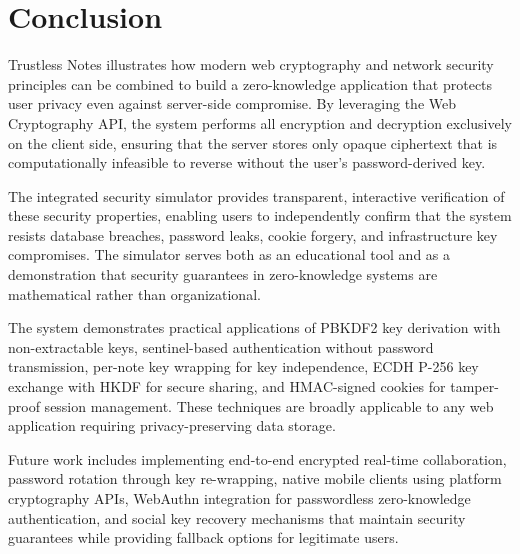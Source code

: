 \documentclass[conference]{IEEEtran}
\begin{document}
\section{Conclusion}

Trustless Notes illustrates how modern web cryptography and network security principles can be combined to build a zero-knowledge application that protects user privacy even against server-side compromise. By leveraging the Web Cryptography API, the system performs all encryption and decryption exclusively on the client side, ensuring that the server stores only opaque ciphertext that is computationally infeasible to reverse without the user's password-derived key.

The integrated security simulator provides transparent, interactive verification of these security properties, enabling users to independently confirm that the system resists database breaches, password leaks, cookie forgery, and infrastructure key compromises. The simulator serves both as an educational tool and as a demonstration that security guarantees in zero-knowledge systems are mathematical rather than organizational.

The system demonstrates practical applications of PBKDF2 key derivation with non-extractable keys, sentinel-based authentication without password transmission, per-note key wrapping for key independence, ECDH P-256 key exchange with HKDF for secure sharing, and HMAC-signed cookies for tamper-proof session management. These techniques are broadly applicable to any web application requiring privacy-preserving data storage.

Future work includes implementing end-to-end encrypted real-time collaboration, password rotation through key re-wrapping, native mobile clients using platform cryptography APIs, WebAuthn integration for passwordless zero-knowledge authentication, and social key recovery mechanisms that maintain security guarantees while providing fallback options for legitimate users.
\end{document}
